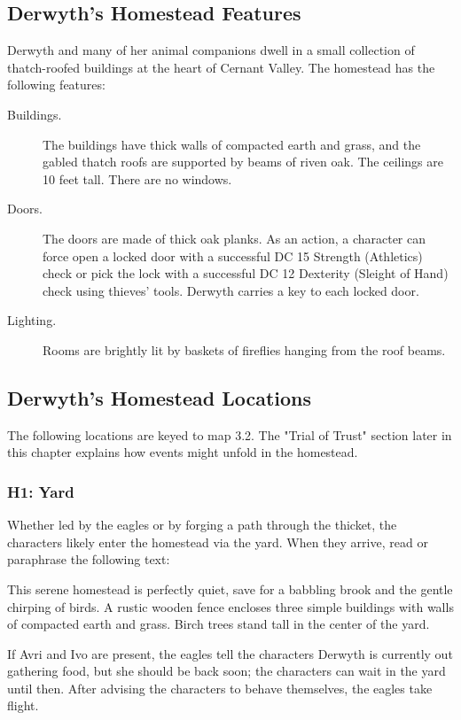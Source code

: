 \documentclass[10pt,a4paper,twoside,bg=print,twocolumn,openany,nodeprecatedcode]{dndbook}
\begin{document}
\subsection{Derwyth's Homestead Features}
Derwyth and many of her animal companions dwell in a small collection of thatch-roofed buildings at the heart of Cernant Valley. The homestead has the following features:


\begin{description}
\item[Buildings.]
The buildings have thick walls of compacted earth and grass, and the gabled thatch roofs are supported by beams of riven oak. The ceilings are 10 feet tall. There are no windows.
\item[Doors.]
The doors are made of thick oak planks. As an action, a character can force open a locked door with a successful DC 15 Strength (Athletics) check or pick the lock with a successful DC 12 Dexterity (Sleight of Hand) check using thieves' tools. Derwyth carries a key to each locked door.
\item[Lighting.]
Rooms are brightly lit by baskets of fireflies hanging from the roof beams.
\end{description}

\subsection{Derwyth's Homestead Locations}
The following locations are keyed to map 3.2. The "Trial of Trust" section later in this chapter explains how events might unfold in the homestead.

\subsubsection{H1: Yard}
Whether led by the eagles or by forging a path through the thicket, the characters likely enter the homestead via the yard. When they arrive, read or paraphrase the following text:

\begin{DndReadAloud}{}
This serene homestead is perfectly quiet, save for a babbling brook and the gentle chirping of birds. A rustic wooden fence encloses three simple buildings with walls of compacted earth and grass. Birch trees stand tall in the center of the yard.

\end{DndReadAloud}

If Avri and Ivo are present, the eagles tell the characters Derwyth is currently out gathering food, but she should be back soon; the characters can wait in the yard until then. After advising the characters to behave themselves, the eagles take flight.
\end{document}
